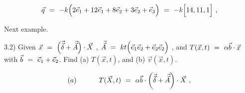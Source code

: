 \documentclass{article}
\newcounter{subsubsubsection}[subsubsection]
\begin{document}
\begin{equation} \label{eq:1}
\vec{q} \hspace{0.125cm} = \hspace{0.125cm} - k \Big( 2 \vec{e}_1 + 12 \vec{e}_1 + 8 \vec{e}_2 + 3 \vec{e}_2 + \vec{e}_3 \Big) \hspace{0.125cm} = \hspace{0.125cm} - k \Big[ 14 , 11 , 1 \Big] \hspace{0.125cm} , 
\end{equation}


Next example. 

3.2) Given \begin{math} \vec{x} \hspace{0.125cm} = \hspace{0.125cm} \Big( \vec{\vec{\delta}} + \vec{\vec{A}} \Big) \cdot \vec{X} \end{math} ,  \begin{math} \vec{\vec{A}} \hspace{0.125cm} = \hspace{0.125cm} k t \Big( \vec{e}_1 \vec{e}_2 + \vec{e}_2 \vec{e}_2 \Big) \end{math} , and  \begin{math} T( \vec{x} , t ) \hspace{0.125cm} = \hspace{0.125cm} \alpha \vec{b} \cdot \vec{x} \end{math} with \begin{math} \vec{b} \hspace{0.125cm} = \hspace{0.125cm} \vec{e}_1 + \vec{e}_2 \end{math}. Find (a) \begin{math} T( \vec{x} , t ) \end{math}, and (b) \begin{math} \vec{v}( \vec{x} , t ) \end{math}.

\begin{equation} \label{eq:1}
(a) \hspace{1.125cm} T( \vec{X} , t ) \hspace{0.125cm} = \hspace{0.125cm} \alpha \vec{b} \cdot \bigg( \vec{\vec{\delta}} + \vec{\vec{A}} \bigg) \cdot \vec{X} \hspace{0.125cm} , 
\end{equation}
\end{document}
